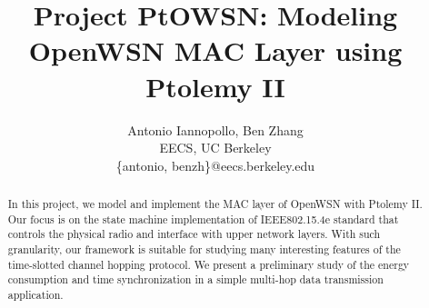 \documentclass[9pt,twocolumn]{article}
\begin{document}
\title{Project PtOWSN: Modeling OpenWSN MAC Layer using Ptolemy II}

\author{
  Antonio Iannopollo, Ben Zhang\\
  EECS, UC Berkeley\\
  \{antonio, benzh\}@eecs.berkeley.edu
}

\maketitle
\thispagestyle{empty}

\begin{abstract}
In this project, we model and implement the MAC layer of OpenWSN with Ptolemy II. Our focus is on the state machine implementation of IEEE802.15.4e standard that controls the physical radio and interface with upper network layers. With such granularity, our framework is suitable for studying many interesting features of the time-slotted channel hopping protocol. We present a preliminary study of the energy consumption and time synchronization in a simple multi-hop data transmission application. 
\end{abstract}









\end{document}

